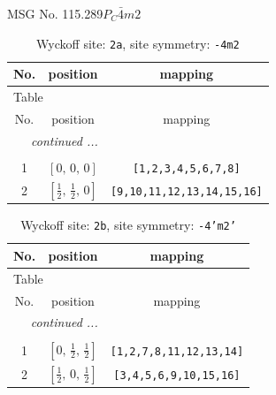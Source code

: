 \documentclass[fleqn,8pt]{jsarticle}
\begin{document}
\setcounter{MaxMatrixCols}{32}

\renewcommand{\tablename}{Table~}
\renewcommand{\figurename}{Figure~}
\begin{center}
\LARGE
MSG No. 115.289\quad$P_{C}\bar{4}m2$
\end{center}
\renewcommand{\arraystretch}{1.2}
\begin{longtable}{ccc}
\caption{Wyckoff site: {\tt 2a}, site symmetry: {\tt -4m2}}
 \\
 \hline \hline
No. & position & mapping \\ \hline \endfirsthead

\multicolumn{2}{l}{\tablename\ \thetable{}} \\
 \hline \hline
No. & position & mapping \\ \hline \endhead

 \hline \hline
\multicolumn{2}{r}{\footnotesize\it continued ...} \\ \endfoot

 \hline \hline
\multicolumn{2}{r}{} \\ \endlastfoot

1 & $\left[ 0,\, 0,\, 0 \right]$ & {\tt [1,2,3,4,5,6,7,8]} \\ \hline
2 & $\left[ \frac{1}{2},\, \frac{1}{2},\, 0 \right]$ & {\tt [9,10,11,12,13,14,15,16]} \\
\end{longtable}
\renewcommand{\arraystretch}{1.2}
\begin{longtable}{ccc}
\caption{Wyckoff site: {\tt 2b}, site symmetry: {\tt -4'm2'}}
 \\
 \hline \hline
No. & position & mapping \\ \hline \endfirsthead

\multicolumn{2}{l}{\tablename\ \thetable{}} \\
 \hline \hline
No. & position & mapping \\ \hline \endhead

 \hline \hline
\multicolumn{2}{r}{\footnotesize\it continued ...} \\ \endfoot

 \hline \hline
\multicolumn{2}{r}{} \\ \endlastfoot

1 & $\left[ 0,\, \frac{1}{2},\, \frac{1}{2} \right]$ & {\tt [1,2,7,8,11,12,13,14]} \\ \hline
2 & $\left[ \frac{1}{2},\, 0,\, \frac{1}{2} \right]$ & {\tt [3,4,5,6,9,10,15,16]} \\
\end{longtable}
\end{document}
